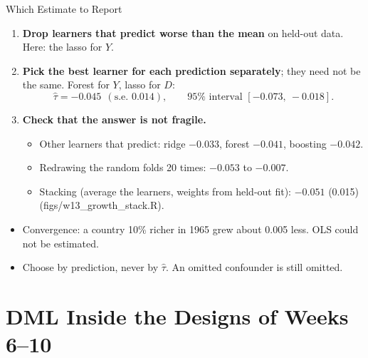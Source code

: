 \documentclass[aspectratio=169,11pt,xcolor=dvipsnames]{beamer}
\newcommand{\srcp}[1]{{\scriptsize\color{gray}(#1)}}
\newcommand{\core}{\,\raisebox{0.6pt}{\textcolor{corestar}{$\bigstar$}}}
\begin{document}
\begin{frame}{Which Estimate to Report\core}
\begin{enumerate}\itemsep2pt
  \item \textbf{Drop learners that predict worse than the mean} on held-out data. Here: the lasso for $Y$.
  \item \textbf{Pick the best learner for each prediction separately}; they need not be the same. Forest for $Y$,
        lasso for $D$:
        \[ \hat\tau = -0.045 \ \ (\text{s.e. } 0.014), \qquad 95\% \text{ interval } [-0.073,\ -0.018] . \]
  \item \textbf{Check that the answer is not fragile.}
  \begin{itemize}\itemsep2pt
    \item Other learners that predict: ridge $-0.033$, forest $-0.041$, boosting $-0.042$.
    \item Redrawing the random folds 20 times: $-0.053$ to $-0.007$.
    \item Stacking (average the learners, weights from held-out fit): $-0.051$ (0.015) \srcp{figs/w13\_growth\_stack.R}.
  \end{itemize}
\end{enumerate}
\vskip3pt
\begin{itemize}\itemsep3pt
  \item Convergence: a country 10\% richer in 1965 grew about 0.005 less. OLS could not be estimated.
  \item Choose by prediction, never by $\hat\tau$. An omitted confounder is still omitted.
\end{itemize}
\end{frame}

\section[DML in Designs]{DML Inside the Designs of Weeks 6--10}
\begin{frame}\sectionpage\end{frame}
\end{document}
